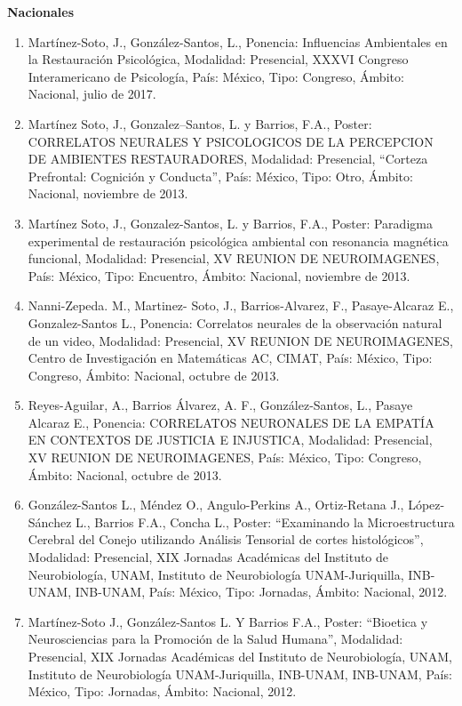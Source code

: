 \textbf{Nacionales}

\begin{enumerate}

\item  Martínez-Soto, J., González-Santos, L., Ponencia: Influencias Ambientales en la Restauración Psicológica, Modalidad: 
Presencial, XXXVI Congreso Interamericano de Psicología, País: México, Tipo: Congreso, Ámbito: Nacional, julio de 2017.

\item  Martínez Soto, J., Gonzalez--Santos, L. y Barrios, F.A., Poster: CORRELATOS NEURALES Y PSICOLOGICOS DE LA PERCEPCION 
DE 
AMBIENTES RESTAURADORES, Modalidad: Presencial, “Corteza Prefrontal: Cognición y Conducta”, País: México, Tipo: Otro, Ámbito: 
Nacional, noviembre de 2013.

\item  Martínez Soto, J., Gonzalez-Santos, L. y Barrios, F.A., Poster: Paradigma experimental de restauración psicológica 
ambiental con resonancia magnética funcional, Modalidad: Presencial, XV REUNION DE NEUROIMAGENES, País: México, Tipo: 
Encuentro, Ámbito: Nacional, noviembre de 2013.

\item  Nanni-Zepeda. M., Martinez- Soto, J., Barrios-Alvarez, F., Pasaye-Alcaraz E., Gonzalez-Santos L., Ponencia: Correlatos 
neurales de la observación natural de un video, Modalidad: Presencial, XV REUNION DE NEUROIMAGENES, Centro de Investigación 
en Matemáticas AC, CIMAT, País: México, Tipo: Congreso, Ámbito: Nacional, octubre de 2013.

\item  Reyes-Aguilar, A., Barrios Álvarez, A. F., González-Santos, L., Pasaye Alcaraz E., Ponencia: CORRELATOS NEURONALES DE 
LA 
EMPATÍA EN CONTEXTOS DE JUSTICIA E INJUSTICA, Modalidad: Presencial, XV REUNION DE NEUROIMAGENES, País: México, Tipo: 
Congreso, Ámbito: Nacional, octubre de 2013.

\item  González-Santos L., Méndez O., Angulo-Perkins A., Ortiz-Retana J., López-Sánchez L., Barrios F.A., Concha L., Poster: 
“Examinando la Microestructura Cerebral del Conejo utilizando Análisis Tensorial de cortes histológicos”, Modalidad: 
Presencial, XIX Jornadas Académicas del Instituto de Neurobiología, UNAM, Instituto de Neurobiología UNAM-Juriquilla, 
INB-UNAM, INB-UNAM, País: México, Tipo: Jornadas, Ámbito: Nacional, 2012.

\item  Martínez-Soto J., González-Santos L. Y Barrios F.A., Poster: “Bioetica y Neurosciencias para la Promoción de la Salud 
Humana”, Modalidad: Presencial, XIX Jornadas Académicas del Instituto de Neurobiología, UNAM, Instituto de Neurobiología 
UNAM-Juriquilla, INB-UNAM, INB-UNAM, País: México, Tipo: Jornadas, Ámbito: Nacional, 2012.


\end{enumerate}
